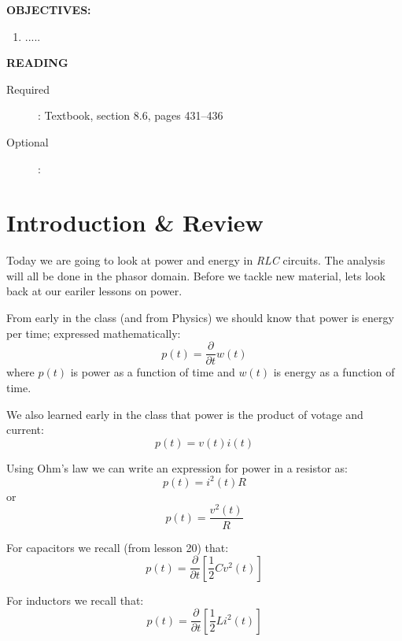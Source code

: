 \documentclass{handout}
\begin{document}
\maketitle

\textbf{OBJECTIVES:}
\begin{enumerate}
\item .....
\end{enumerate}

\textbf{READING}
\begin{description}
\item [Required]:
Textbook, section 8.6, pages 431--436
\item [Optional]:
\end{description}

\section{Introduction \& Review}
Today we are going to look at power and energy in {\em RLC} circuits.  The analysis will all be done in the phasor domain.  Before we tackle new material, lets look back at our eariler lessons on power.

From early in the class (and from Physics) we should know that power is energy per time; expressed mathematically:
\begin{equation}
p(t) = \frac{\partial}{\partial t}w(t)
\label{eq: PE}
\end{equation}
where $p(t)$ is power as a function of time and $w(t)$ is energy as a function of time.

We also learned early in the class that power is the product of votage and current:
\begin{equation}
p(t) = v(t)i(t)
\label{eq: Power}
\end{equation}

Using Ohm's law we can write an expression for power in a resistor as:
\begin{equation}
p(t)=i^2(t)R
\label{eq: ResistorPower}
\end{equation}
or
\[
p(t)=\frac{v^2(t)}{R}
\]

For capacitors we recall (from lesson 20) that:
\begin{equation}
p(t) = \frac{\partial }{\partial t}\left[ \frac{1}{2}Cv^2(t) \right]
\label{eq: CapPower}
\end{equation}

For inductors we recall that:
\begin{equation}
p(t) = \frac{\partial }{\partial t}\left[ \frac{1}{2}Li^2(t) \right]
\label{eq: IndPower}
\end{equation}
\end{document}
